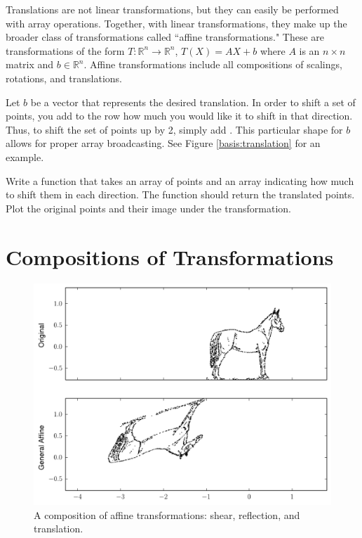 Translations are not linear transformations, but they can easily be performed with array operations. Together, with linear transformations, they make up the broader class of transformations called
``affine transformations." These are transformations of the form $T: \mathbb{R}^n \to \mathbb{R}^n$, $T(X) = AX + b$ where $A$ is an $n\times n$ matrix and $b \in \mathbb{R}^n$. Affine transformations include all compositions of scalings, rotations, and translations.


Let $b$ be a vector that represents the desired translation.
In order to shift a set of points, you add to the row how much you would like it to shift in that direction. Thus, to shift the set of points up by 2, simply add . This particular shape for $b$ allows for proper array broadcasting.
See Figure \ref{basis:translation} for an example.

\begin{problem}
Write a function that takes an array of points and an array indicating how much to shift them in each direction. The function should return the translated points.
Plot the original points and their image under the transformation.
\end{problem}

\section*{Compositions of Transformations}

\begin{figure}
\centering
\includegraphics[width=\textwidth]{combo.pdf}
\caption{
A composition of affine transformations: shear, reflection, and translation.}
\label{basis:combo}
\end{figure}

